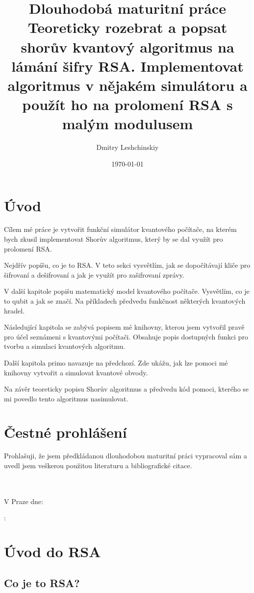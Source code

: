 \documentclass[11pt]{article}
\title{Dlouhodobá maturitní práce \\
\large Teoreticky rozebrat a popsat shorův kvantový algoritmus na lámání šifry RSA. 
Implementovat algoritmus v nějakém simulátoru a použít ho na prolomení RSA s malým modulusem}
\author{Dmitry Leshchinskiy}
\date{\today}
\makeatletter
\let\myauthor\@author
\let\mydate\@date
\makeatother
\begin{document}
\maketitle
\newpage

\tableofcontents
\newpage

\section{Úvod}
Cílem mé práce je vytvořit funkční simulátor kvantového počítače, na kterém bych zkusil implementovat Shorův algoritmus, který by se dal využít pro prolomení RSA.
\par Nejdřív popíšu, co je to RSA.
V teto sekci vysvětlím, jak se dopočítávají kliče pro šifrovaní a dešifrovaní a jak je využít pro zašifrovaní zprávy.
\par V další kapitole popišu matematický model kvantového počítače.
Vysvětlím, co je to qubit a jak se značí.
Na příkladech předvedu funkčnost některých kvantových hradel.
\par Následující kapitola se zabývá popisem mé knihovny, kterou jsem vytvořil pravě pro účel seznámeni s kvantovými počítači.
Obsahuje popis dostupných funkci pro tvorbu a simulaci kvantových algoritmu.
\par Další kapitola primo navazuje na předchozí.
Zde ukážu, jak lze pomoci mé knihovny vytvořit a simulovat kvantové obvody.
\par Na závěr teoreticky popisu Shorův algoritmus a předvedu kód pomoci, kterého se mi povedlo tento algoritmus nasimulovat.
\newpage

\section{Čestné prohlášení}
Prohlašuji, že jsem předkládanou dlouhodobou maturitní práci vypracoval
sám a uvedl jsem veškerou použitou literaturu a bibliografické citace.
\\ \\ \\
\par V Praze dne: \mydate \\
\par \myauthor: \hrulefill
\newpage

\section{Úvod do RSA}
\subsection{Co je to RSA?}
\end{document}

